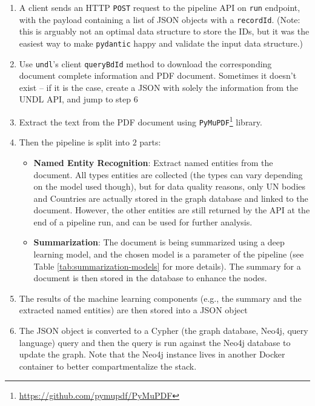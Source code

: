 \begin{enumerate}
    \item A client sends an HTTP \texttt{POST} request to the pipeline API on \texttt{run} endpoint, with the payload containing a list of JSON objects with a \texttt{recordId}. (Note: this is arguably not an optimal data structure to store the IDs, but it was the easiest way to make \texttt{pydantic} happy and validate the input data structure.)

    \item Use \texttt{undl}'s client \texttt{queryBdId} method to download the corresponding document complete information and PDF document. Sometimes it doesn't exist – if it is the case, create a JSON with solely the information from the UNDL API, and jump to step $6$

    \item Extract the text from the PDF document using \texttt{PyMuPDF}\footnote{\url{https://github.com/pymupdf/PyMuPDF}} library.

    \item Then the pipeline is split into $2$ parts:
          \begin{itemize}
              \item \textbf{Named Entity Recognition}: Extract named entities from the document. All types entities are collected (the types can vary depending on the model used though), but for data quality reasons, only UN bodies and Countries are actually stored in the graph database and linked to the document. However, the other entities are still returned by the API at the end of a pipeline run, and can be used for further analysis.

              \item \textbf{Summarization}: The document is being summarized using a deep learning model, and the chosen model is a parameter of the pipeline (see Table \ref{tab:summarization-models} for more details). The summary for a document is then stored in the database to enhance the nodes.
          \end{itemize}
    \item The results of the machine learning components (e.g., the summary and the extracted named entities) are then stored into a JSON object
    \item The JSON object is converted to a Cypher (the graph database, Neo4j, query language) query and then the query is run against the Neo4j database to update the graph. Note that the Neo4j instance lives in another Docker container to better compartmentalize the stack.
\end{enumerate}


